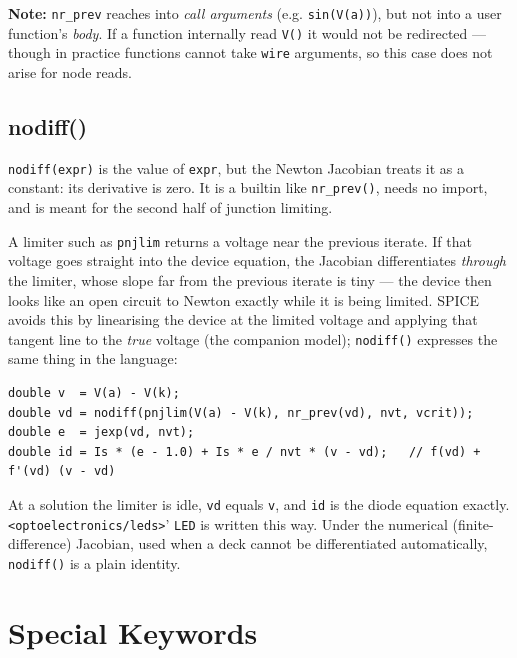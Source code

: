 \documentclass[11pt, a4paper]{article}
\newcommand{\code}[1]{\texttt{\small #1}}
\begin{document}
\textbf{Note:} \code{nr\_prev} reaches into \textit{call arguments}
(e.g. \code{sin(V(a))}), but not into a user function's \textit{body}. If a
function internally read \code{V()} it would not be redirected --- though in
practice functions cannot take \code{wire} arguments, so this case does not
arise for node reads.

\subsection{nodiff()}
\code{nodiff(expr)} is the value of \code{expr}, but the Newton Jacobian treats
it as a constant: its derivative is zero. It is a builtin like \code{nr\_prev()},
needs no import, and is meant for the second half of junction limiting.

A limiter such as \code{pnjlim} returns a voltage near the previous iterate. If
that voltage goes straight into the device equation, the Jacobian differentiates
\emph{through} the limiter, whose slope far from the previous iterate is tiny ---
the device then looks like an open circuit to Newton exactly while it is being
limited. SPICE avoids this by linearising the device at the limited voltage and
applying that tangent line to the \emph{true} voltage (the companion model);
\code{nodiff()} expresses the same thing in the language:

\begin{lstlisting}
double v  = V(a) - V(k);
double vd = nodiff(pnjlim(V(a) - V(k), nr_prev(vd), nvt, vcrit));
double e  = jexp(vd, nvt);
double id = Is * (e - 1.0) + Is * e / nvt * (v - vd);   // f(vd) + f'(vd) (v - vd)
\end{lstlisting}

At a solution the limiter is idle, \code{vd} equals \code{v}, and \code{id} is the
diode equation exactly. \code{<optoelectronics/leds>}' \code{LED} is written this
way. Under the numerical (finite-difference) Jacobian, used when a deck cannot be
differentiated automatically, \code{nodiff()} is a plain identity.

\section{Special Keywords}
\end{document}
